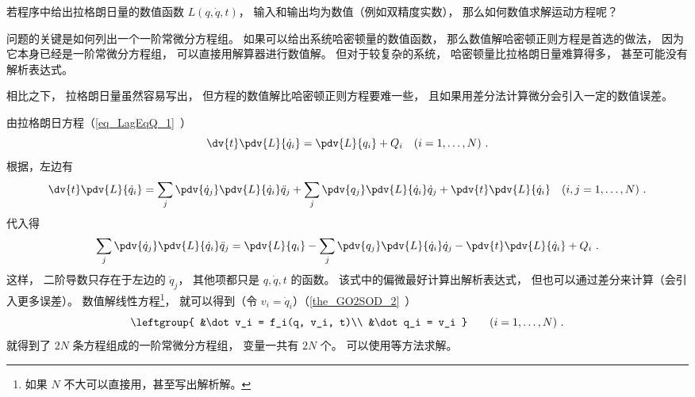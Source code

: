 
\begin{issues}
\issueDraft
\end{issues}


若程序中给出拉格朗日量的数值函数 $L(q, \dot q, t)$， 输入和输出均为数值（例如双精度实数）， 那么如何数值求解运动方程呢？

问题的关键是如何列出一个一阶常微分方程组。 如果可以给出系统哈密顿量的数值函数， 那么数值解哈密顿正则方程是首选的做法， 因为它本身已经是一阶常微分方程组， 可以直接用解算器进行数值解。 但对于较复杂的系统， 哈密顿量比拉格朗日量难算得多， 甚至可能没有解析表达式。

相比之下， 拉格朗日量虽然容易写出， 但方程的数值解比哈密顿正则方程要难一些， 且如果用差分法计算微分会引入一定的数值误差。

由拉格朗日方程（\autoref{eq_LagEqQ_1}~）
\begin{equation}
\dv{t} \pdv{L}{\dot q_i} = \pdv{L}{q_i} + Q_i
\quad (i=1,\dots,N)~.
\end{equation}
根据，左边有
\begin{equation}
\dv{t} \pdv{L}{\dot q_i} = \sum_j\pdv{\dot q_j}\pdv{L}{\dot q_i}\ddot q_j + \sum_j\pdv{q_j}\pdv{L}{\dot q_i}\dot q_j + \pdv{t}\pdv{L}{\dot q_i} \quad (i,j=1,\dots,N)~.
\end{equation}
代入得
\begin{equation}
\sum_j\pdv{\dot q_j}\pdv{L}{\dot q_i}\ddot q_j = \pdv{L}{q_i} - \sum_j\pdv{q_j}\pdv{L}{\dot q_i}\dot q_j - \pdv{t}\pdv{L}{\dot q_i} + Q_i~.
\end{equation}
这样， 二阶导数只存在于左边的 $\ddot q_j$， 其他项都只是 $q,\dot q, t$ 的函数。 该式中的偏微最好计算出解析表达式， 但也可以通过差分来计算（会引入更多误差）。 数值解线性方程\footnote{如果 $N$ 不大可以直接用，甚至写出解析解。}， 就可以得到（令 $v_i = \dot q_i$）（\autoref{the_GO2SOD_2}~）
\begin{equation}
\leftgroup{
&\dot v_i = f_i(q, v_i, t)\\
&\dot q_i = v_i
}\qquad (i = 1,\dots,N)~.
\end{equation}
就得到了 $2N$ 条方程组成的一阶常微分方程组， 变量一共有 $2N$ 个。 可以使用等方法求解。

